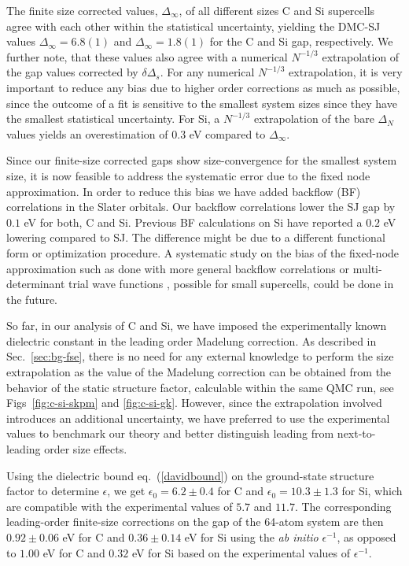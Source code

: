 The finite size corrected values, $\Delta_\infty$, of all different sizes C and Si supercells agree with
each other within the statistical uncertainty, yielding the DMC-SJ values $\Delta_\infty=6.8(1)$
and  $\Delta_\infty=1.8(1)$ for the C and Si gap, respectively. 
We further note, that these values also agree with a numerical
$N^{-1/3}$ extrapolation of the gap values corrected by $\delta \Delta_s$. For any numerical
$N^{-1/3}$ extrapolation, it is very important to reduce any bias due to higher order corrections
as much as possible, since the outcome of a fit is sensitive to the smallest system sizes
since they have the smallest statistical uncertainty. For Si,
a $N^{-1/3}$ extrapolation
of the bare $\Delta_N$ values yields an overestimation of $0.3$ eV compared to $\Delta_\infty$.

Since our finite-size corrected gaps show size-convergence for the smallest system size,
it is now feasible to address the systematic error due to the fixed node approximation.
In order to reduce this bias
we have added backflow (BF) correlations in the Slater orbitals. Our backflow correlations lower
the SJ gap by $0.1$ eV for both, C and Si.
Previous BF calculations \cite{Hunt} on Si have reported a $0.2$ eV lowering compared to SJ.
The difference might be due to a different functional form or optimization procedure.
A systematic study on the bias of the fixed-node approximation such as done with more general backflow correlations \cite{BFN,orbitalbf} or
multi-determinant trial wave functions \cite{Zhao19}, possible for small supercells,
could be done in the future.

So far, in our analysis of C and Si, we have imposed the experimentally known dielectric constant
in the leading order Madelung correction. As described in Sec.~\ref{sec:bg-fse},
there is no need for any external knowledge to perform the size extrapolation as the value
of the Madelung correction can be obtained from the behavior of the static structure factor,
calculable within the same QMC run, see  Figs~\ref{fig:c-si-skpm} and \ref{fig:c-si-gk}. However, since
 the extrapolation involved introduces an additional uncertainty, we have preferred to use
the experimental values to benchmark our theory and better distinguish leading
from next-to-leading order size effects. 

Using the dielectric bound eq.~(\ref{davidbound}) on the ground-state structure factor to determine $\epsilon$, we get $\epsilon_0=6.2\pm0.4$ for C and $\epsilon_0=10.3\pm1.3$ for Si, which are compatible with the experimental values of $5.7$ and $11.7$. The corresponding leading-order finite-size corrections on the gap of the 64-atom system are then $0.92\pm0.06$ eV for C and $0.36\pm0.14$ eV for Si using the \emph{ab initio} $\epsilon^{-1}$, as opposed to $1.00$ eV for C and $0.32$ eV for Si based on the experimental values of $\epsilon^{-1}$.

